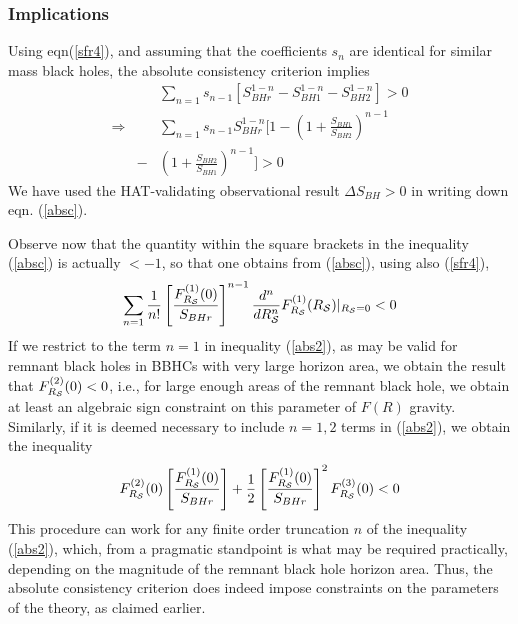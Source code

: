\documentclass[11pt]{article}
\begin{document}
\subsubsection{Implications}

Using eqn(\ref{sfr4}), and assuming that the coefficients $s_n$ are identical for similar mass black holes, the absolute consistency criterion implies
\begin{eqnarray}
&& \sum_{n=1}  s_{n-1} \left [ S_{BHr}^{1-n} - S_{BH1}^{1-n} - S_{BH2}^{1-n} \right] > 0 \nonumber \\
\Rightarrow && \sum_{n=1}  s_{n-1} S_{BHr}^{1-n} [ 1 - \left( 1+ \frac{S_{BH1}}{S_{BH2}} \right) ^{n-1} \nonumber \\
&-& \left( 1+ \frac{S_{BH2}}{S_{BH1}} \right) ^{n-1}] > 0 \label{absc}
\end{eqnarray}
We have used the HAT-validating observational result $ \Delta S_{BH} > 0$ in writing down eqn. (\ref{absc}). 

Observe now that the quantity within the square brackets in the inequality (\ref{absc}) is actually $< -1$, so that one obtains from (\ref{absc}), using also (\ref{sfr4}), 
\begin{eqnarray}
\sum_{n=1} \frac{1}{n!} \left[ \frac{F_{R_{\cal S}}^{(1)}(0)}{S_{BHr}} \right]^{n-1} \frac{d^n}{d R_{\cal S}^n} F_{R_{\cal S}}^{(1)} (R_{\cal S}) |_{R_{\cal S}=0} < 0 \label{abs2}   
\end{eqnarray}
If we restrict to the term $n=1$ in inequality (\ref{abs2}), as may be valid for remnant black holes in BBHCs with very large horizon area, we obtain the result that $F^{(2)}_{R_{\cal S}}(0) < 0$, i.e., for large enough areas of the remnant black hole, we obtain at least an algebraic sign constraint on this parameter of $F(R)$ gravity. Similarly, if it is deemed necessary to include $n=1,2$ terms in (\ref{abs2}), we obtain the inequality 
\begin{eqnarray}
F^{(2)}_{R_{\cal S}}(0) \left[ \frac{F_{R_{\cal S}}^{(1)}(0)}{S_{BHr}} \right]  + \frac12 \left[ \frac{F_{R_{\cal S}}^{(1)}(0)}{S_{BHr}} \right]^2 F^{(3)}_{R_{\cal S}}(0) < 0
\end{eqnarray}
This procedure can work for any finite order truncation $n$ of the inequality (\ref{abs2}), which, from a pragmatic standpoint is what may be required practically, depending on the magnitude of the remnant black hole horizon area. Thus, the absolute consistency criterion does indeed impose constraints on the parameters of the theory, as claimed earlier.
\end{document}
